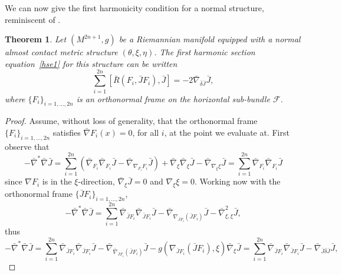 \documentclass[a4paper,reqno]{amsart}
\newtheorem{theorem}[thm]{Theorem}
\theoremstyle{definition}
\theoremstyle{remark}
\theoremstyle{plain}
\numberwithin{equation}{section}
\newcommand{\f}{\mathcal{F}}
\begin{document}
We can now give the first harmonicity condition for a normal structure, reminiscent of \cite[Theorem 2.8]{CMW2}.

\begin{theorem}\label{thm3.1}
  Let $(M^{2n+1},g)$ be a Riemannian manifold equipped with a
  normal almost contact metric structure $(\theta,\xi,\eta)$.
  The first harmonic section equation~\eqref{hse1} for this
  structure can be written
  $$
  \sum_{i=1}^{2n}[\bar{R}(F_i,\bar{J}
  F_i),\bar{J}]=-2\bar{\nabla}_{\bar{\delta} \bar{J}} \bar{J},
  $$
where $\{F_i\}_{i=1,\dots, 2n}$ is an orthonormal frame on the
horizontal sub-bundle $\f$.
\end{theorem}

\begin{proof} Assume, without loss of generality, that the
  orthonormal frame $\{F_i\}_{i=1,\dots, 2n}$ satisfies
  $\bar{\nabla}F_i (x)=0$, for all $i$, at the point we evaluate
  at. First observe that
\begin{equation*}
-\bar{\nabla}^*\bar{\nabla}\bar{J} =\sum_{i=1}^{2n}(\bar{\nabla}_{F_i}\bar{\nabla}_{F_i}\bar{J} -\bar{\nabla}_{\nabla_{F_i}F_i}\bar{J}) +\bar{\nabla}_{\xi}\bar{\nabla}_{\xi}\bar{J} -\bar{\nabla}_{\nabla_{\xi}\xi}\bar{J} =\sum_{i=1}^{2n}\bar{\nabla}_{F_i}\bar{\nabla}_{F_i}\bar{J} 
\end{equation*}
since $\nabla F_i$ is in the $\xi$-direction, $\bar{\nabla}_{\xi}\bar{J}=0$ and $\nabla_{\xi}\xi =0$.
Working now with the orthonormal frame $\{\bar{J}F_i\}_{i=1,\dots,
  2n}$, 
$$-\bar{\nabla}^*\bar{\nabla}\bar{J}
  =\sum_{i=1}^{2n}\bar{\nabla}_{\bar{J}F_i}\bar{\nabla}_{\bar{J}F_i}\bar{J} -
    \bar{\nabla}_{\nabla_{\bar{J}F_i} (\bar{J}F_i)}\bar{J}
    -\bar{\nabla}^2_{\xi,\xi}\bar{J},$$ 
thus
\[
-\bar{\nabla}^*\bar{\nabla}\bar{J} =  \sum_{i=1}^{2n}\bar{\nabla}_{\bar{J}F_i}\bar{\nabla}_{\bar{J}F_i}\bar{J}  -
    \bar{\nabla}_{\bar{\nabla}_{\bar{J}F_i} (\bar{J}F_i)}\bar{J}  -g( \nabla_{\bar{J}F_i} (\bar{J}F_i), \xi ) \bar{\nabla}_{\xi} \bar{J} 
 =\sum_{i=1}^{2n}\bar{\nabla}_{\bar{J}F_i}\bar{\nabla}_{\bar{J}F_i}\bar{J}- \bar{\nabla}_{\bar{J}\bar{\delta} \bar{J}}\bar{J},
\]

\end{proof}
\end{document}
